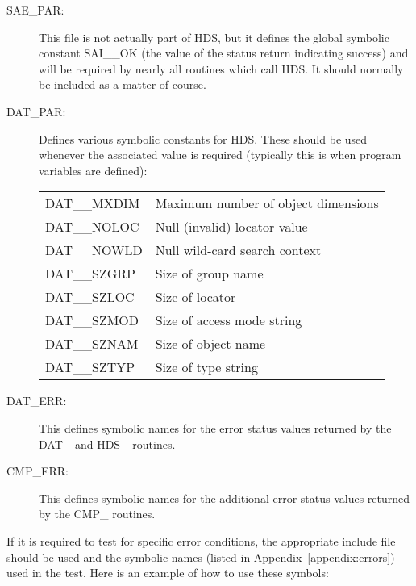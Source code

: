 \documentclass[11pt]{article}
\newcommand{\htmlref}[2]{#1}
\newcommand{\xlabel}[1]{}
\begin{document}
\begin{description}

\item [SAE\_PAR:]
This file is not actually part of HDS, but it defines the global
symbolic constant SAI\_\_OK (the value of the status return indicating
success) and will be required by nearly all routines which call
HDS. It should normally be included as a matter of course.

\item [\xlabel{list_of_symbolic_constants}DAT\_PAR:]
Defines various symbolic constants for HDS. These should be used
whenever the associated value is required (typically this is when
program variables are defined):

\begin{center}
\begin{tabular}{ll}
DAT\_\_MXDIM & Maximum number of object dimensions\\
DAT\_\_NOLOC & Null (invalid) \htmlref{locator}{sect:locators} value\\
DAT\_\_NOWLD & Null wild-card search context\\
DAT\_\_SZGRP & Size of \htmlref{group}{sect:group} name\\
DAT\_\_SZLOC & Size of locator\\
DAT\_\_SZMOD & Size of access mode string\\
DAT\_\_SZNAM & Size of object \htmlref{name}{sect:name}\\
DAT\_\_SZTYP & Size of \htmlref{type}{sect:type} string
\end{tabular}
\end{center}

\item [DAT\_ERR:]
This defines symbolic names for the error status values returned by
the DAT\_ and HDS\_ routines.

\item [CMP\_ERR:]
This defines symbolic names for the additional error status values
returned by the \htmlref{CMP\_ routines}{appendix:cmproutines}.
\end{description}

If it is required to test for specific error conditions, the
appropriate include file should be used and the symbolic names (listed
in Appendix~\ref{appendix:errors}) used in the test. Here is an
example of how to use these symbols:
\end{document}
